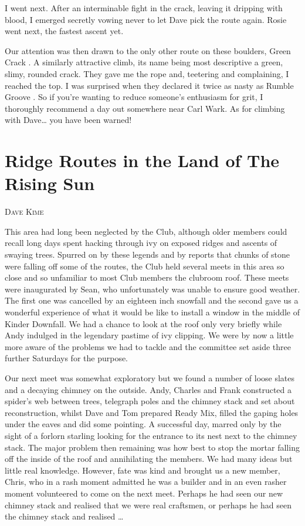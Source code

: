\documentclass[a5paper,openany,font 10pt]{scrbook}
\makeatletter
\newcommand{\chapterauthor}[1]{%
{\parindent0pt\vspace*{-5pt}%
\linespread{1.1}\large\scshape#1%
\par\nobreak\vspace*{35pt}}
\@afterheading%
}
\makeatother
\begin{document}
I went next. After an interminable fight in the crack,
leaving it dripping with blood, I emerged secretly vowing never
to let Dave pick the route again. Rosie went next, the fastest
ascent yet.

Our attention was then drawn to the only other route on
these boulders,  Green Crack . A similarly attractive climb, its
name being most descriptive  a green, slimy, rounded crack. They
gave me the rope and, teetering and complaining, I reached the
top. I was surprised when they declared it twice as nasty as
 Rumble Groove . So if you're wanting to reduce someone's
enthusiasm for grit, I thoroughly recommend a day out somewhere
near Carl Wark. As for climbing with Dave\ldots{} you have been
warned!

\chapter{Ridge Routes in the Land of The Rising Sun}
\label{sec:org3f59717}
\chapterauthor{Dave Kime}

This area had long been neglected by the Club, although
older members could recall long days spent hacking through ivy on
exposed ridges and ascents of swaying trees. Spurred on by these
legends and by reports that chunks of stone were falling off some
of the routes, the Club held several meets in this area so close
and so unfamiliar to most Club members   the clubroom roof.
These meets were inaugurated by Sean, who unfortunately was
unable to ensure good weather. The first one was cancelled by an
eighteen inch snowfall and the second gave us a wonderful
experience of what it would be like to install a window in the
middle of Kinder Downfall. We had a chance to look at the roof
only very briefly while Andy indulged in the legendary pastime of
ivy clipping. We were by now a little more aware of the problems
we had to tackle and the committee set aside three further
Saturdays for the purpose.

Our next meet was somewhat exploratory but we found a number
of loose slates and a decaying chimney on the outside. Andy,
Charles and Frank constructed a spider's web between trees,
telegraph poles and the chimney stack and set about
reconstruction, whilst Dave and Tom prepared Ready Mix, filled
the gaping holes under the eaves and did some pointing. A
successful day, marred only by the sight of a forlorn starling
looking for the entrance to its nest next to the chimney stack.
The major problem then remaining was how best to stop the
mortar falling off the inside of the roof and annihilating the
members. We had many ideas but little real knowledge. However,
fate was kind and brought us a new member, Chris, who in a rash
moment admitted he was a builder and in an even rasher moment
volunteered to come on the next meet. Perhaps he had seen our new
chimney stack and realised that we were real craftsmen, or
perhaps he had seen the chimney stack and realised \ldots{}
\end{document}
